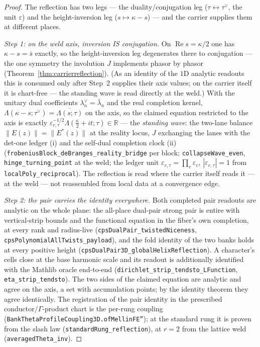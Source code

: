 \documentclass[11pt]{article}
\theoremstyle{definition}
\renewcommand{\Re}{\operatorname{Re}}
\begin{document}
\begin{proof}
The reflection has two legs --- the duality/conjugation leg ($\tau\leftrightarrow\tau^\vee$, the unit
$\varepsilon$) and the height-inversion leg ($s\mapsto\kappa-s$) --- and the carrier supplies them at
different places.

\emph{Step 1: on the weld axis, inversion IS conjugation.} On $\Re s=\kappa/2$ one has $\kappa-s=\bar s$
exactly, so the height-inversion leg degenerates there to conjugation --- the one symmetry the involution $J$
implements phasor by phasor (Theorem~\ref{thm:carrierreflection}). (As an identity of the $1$D analytic
readouts this is consumed only after Step~2 supplies their axis values; on the carrier itself it is chart-free
--- the standing wave is read directly at the weld.) With the unitary dual coefficients
$\lambda_n^{\vee}=\bar\lambda_n$ and the real completion kernel,
$\Lambda(\kappa-s;\tau^\vee)=\overline{\Lambda(s;\tau)}$ on the axis, so the claimed equation restricted to
the axis is exactly $\varepsilon_{r,\tau}^{-1/2}\Lambda(\tfrac\kappa2+it;\tau)\in\mathbb R$ --- the
\emph{standing wave}: the two-lane balance $\|E(z)\|=\|E^{*}(z)\|$ at the reality locus, $J$ exchanging the
lanes with the det-one ledger \textup{(i)} and the self-dual completion clock \textup{(ii)}
(\texttt{frobeniusBlock\_deBranges\_reality\_bridge} per block; \texttt{collapseWave\_even},
\texttt{hinge\_turning\_point} at the weld; the ledger unit $\varepsilon_{r,\tau}=\prod_v\varepsilon_v$,
$|\varepsilon_{r,\tau}|=1$ from \texttt{localPoly\_reciprocal}). The reflection is read where the carrier
itself reads it --- at the weld --- not reassembled from local data at a convergence edge.

\emph{Step 2: the pair carries the identity everywhere.} Both completed pair readouts are analytic on the
whole plane: the all-place dual-pair strong pair is entire with vertical-strip bounds and the functional
equation in the fiber's own completion, at every rank and radius-live
(\texttt{cpsDualPair\_twistedNiceness}, \texttt{cpsPolynomialAllTwists\_payload}), and the fold identity
of the two banks holds at every positive height
(\texttt{cpsDualPair3D\_globalHelixReflection}).  A character's cells close at the base harmonic scale and
its readout is additionally identified with the Mathlib oracle end-to-end
(\texttt{dirichlet\_strip\_tendsto\_LFunction}, \texttt{eta\_strip\_tendsto}).  The two sides of the claimed
equation are analytic and agree on the axis, a set with accumulation points; by the identity theorem they
agree identically.  The registration of the pair identity in the prescribed conductor/$\Gamma$-product
chart is the per-rung coupling (\texttt{BankThetaProfileCoupling3D.ofMellinFE''}); at the standard rung it
is proven from the slash law (\texttt{standardRung\_reflection}), at $r=2$ from the lattice weld
(\texttt{averagedTheta\_inv}).


\end{proof}
\end{document}
